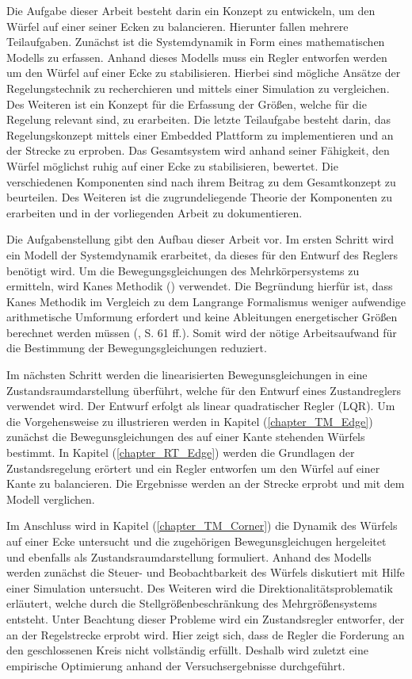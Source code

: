 Die Aufgabe dieser Arbeit besteht darin ein Konzept zu entwickeln, um den Würfel auf einer seiner Ecken zu balancieren. Hierunter fallen mehrere Teilaufgaben. Zunächst ist die Systemdynamik in Form eines mathematischen Modells zu erfassen. Anhand dieses Modells muss ein Regler entworfen werden um den Würfel auf einer Ecke zu stabilisieren. Hierbei sind mögliche Ansätze der Regelungstechnik zu recherchieren und mittels einer Simulation zu vergleichen. Des Weiteren ist ein Konzept für die Erfassung der Größen, welche für die Regelung relevant sind, zu erarbeiten. Die letzte Teilaufgabe besteht darin, das Regelungskonzept mittels einer Embedded Plattform zu implementieren und an der Strecke zu erproben. Das Gesamtsystem wird anhand seiner Fähigkeit, den Würfel möglichst ruhig auf einer Ecke zu stabilisieren, bewertet. Die verschiedenen Komponenten sind nach ihrem Beitrag zu dem Gesamtkonzept zu beurteilen. Des Weiteren ist die zugrundeliegende Theorie der Komponenten zu erarbeiten und in der vorliegenden Arbeit zu dokumentieren.

Die Aufgabenstellung gibt den Aufbau dieser Arbeit vor. Im ersten Schritt wird ein Modell der Systemdynamik erarbeitet, da dieses für den Entwurf des Reglers benötigt wird. Um die Bewegungsgleichungen des Mehrkörpersystems zu ermitteln, wird Kanes Methodik (\cite{KaneBook}) verwendet. Die Begründung hierfür ist, dass Kanes Methodik im Vergleich zu dem Langrange Formalismus weniger aufwendige arithmetische Umformung erfordert und keine Ableitungen energetischer Größen berechnet werden müssen (\cite{Zetina}, S. 61 ff.). Somit wird der nötige Arbeitsaufwand für die Bestimmung der Bewegungsgleichungen reduziert.

Im nächsten Schritt werden die linearisierten Bewegunsgleichungen in eine Zustandsraumdarstellung überführt, welche für den Entwurf eines Zustandreglers verwendet wird. Der Entwurf erfolgt als linear quadratischer Regler (LQR). Um die Vorgehensweise zu illustrieren werden in  Kapitel (\ref{chapter_TM_Edge}) zunächst die Bewegunsgleichungen des auf einer Kante stehenden Würfels bestimmt. In Kapitel (\ref{chapter_RT_Edge}) werden die Grundlagen der Zustandsregelung erörtert und ein Regler entworfen um den Würfel auf einer Kante zu balancieren. Die Ergebnisse werden an der Strecke erprobt und mit dem Modell verglichen.

Im Anschluss wird in Kapitel (\ref{chapter_TM_Corner}) die Dynamik des Würfels auf einer Ecke untersucht und die zugehörigen Bewegunsgleichugen hergeleitet und ebenfalls als Zustandsraumdarstellung formuliert. Anhand des Modells werden zunächst die Steuer- und Beobachtbarkeit des Würfels diskutiert mit Hilfe einer Simulation untersucht. Des Weiteren wird die Direktionalitätsproblematik erläutert, welche durch die Stellgrößenbeschränkung des Mehrgrößensystems entsteht. Unter Beachtung dieser Probleme wird ein Zustandsregler entworfer, der an der Regelstrecke erprobt wird. Hier zeigt sich, dass de Regler die Forderung an den geschlossenen Kreis nicht vollständig erfüllt. Deshalb wird zuletzt eine empirische Optimierung anhand der Versuchsergebnisse durchgeführt.

